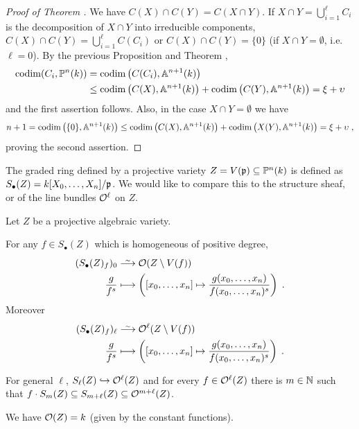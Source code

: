 \documentclass[a4paper,parskip=half,numbers=enddot, DIV=12]{scrreprt}
\begin{document}
\begin{proof}[Proof of Theorem ]
    We have $C(X)\cap C(Y) = C(X\cap Y)$. If $X\cap Y= \bigcup_{i=1}^\ell C_i$ is the decomposition of $X\cap Y$ into irreducible components, $C(X)\cap C(Y) = \bigcup_{i=1}^\ell C(C_i)$ or $C(X) \cap C(Y) = \{0\}$ (if $X\cap Y=\emptyset$, i.e. $\ell=0$). By the previous Proposition and Theorem , 
    \begin{align*}
    	 \operatorname{codim}(C_i, \mathbb{P}^n(k)) &= \operatorname{codim}\big(C(C_i), \mathbb{A}^{n+1}(k)\big)\\
    	 & \leq \operatorname{codim}\big(C(X), \mathbb{A}^{n+1}(k)\big) +\operatorname{codim}\big(C(Y), \mathbb{A}^{n+1}(k)\big)= \xi+\upsilon 
    \end{align*}
   and the first assertion follows. Also, in the case $X\cap Y =\emptyset$ we have 
   \begin{align*}
	   	n+1 = \operatorname{codim}\big(\{0\}, \mathbb{A}^{n+1}(k)\big) \leq \operatorname{codim}\big(C(X),\mathbb{A}^{n+1}(k)\big)+\operatorname{codim}\big(X(Y), \mathbb{A}^{n+1}(k)\big) = \xi +\upsilon\;, 
   \end{align*}
   proving the second assertion.
\end{proof}
\begin{defi}
    The graded ring defined by a projective variety $Z = V(\mathfrak{p}) \subseteq \mathbb{P}^n(k)$ is defined as $S_\bullet(Z) = k[X_0,\ldots, X_n]/\mathfrak{p}$. We would like to compare this to the structure sheaf, or of the line bundles $\mathcal{O}^\ell$ on $Z$. 
\end{defi}
\begin{thm}
    Let $Z$ be a projective algebraic variety. 
    \begin{alphanumerate}    
      \item 
        For any $f\in S_\bullet(Z)$ which is homogeneous of positive degree,
        \begin{align*}
            (S_\bullet(Z)_f)_0 &\isomorphism \Oo(Z\setminus V(f))\\
            \frac{g}{f^s} &\longmapsto \left([x_0,\ldots,x_n] \mapsto \frac{g(x_0,\ldots,x_n)}{f(x_0,\ldots, x_n)^s}\right)\;.
        \end{align*}
        Moreover
        \begin{align*}
            (S_\bullet(Z)_f)_\ell &\isomorphism \Oo^\ell(Z\setminus V(f)) \\
            \frac{g}{f^s} &\longmapsto \left([x_0,\ldots,x_n] \mapsto \frac{g(x_0,\ldots,x_n)}{f(x_0,\ldots, x_n)^s}\right)\;.
        \end{align*}
      \item 
        For general $\ell$, $S_\ell(Z)\monomorphism \Oo^\ell(Z)$ and for every $f\in \mathcal{O}^\ell(Z)$ there is $m\in \mathbb{N}$ such that $f\cdot S_m(Z)\subseteq S_{m+\ell}(Z) \subseteq \mathcal{O}^{m+\ell} (Z)$.
      \item 
         We have $\mathcal{O}(Z) = k$ (given by the constant functions).
    \end{alphanumerate}
\end{thm}
\end{document}
